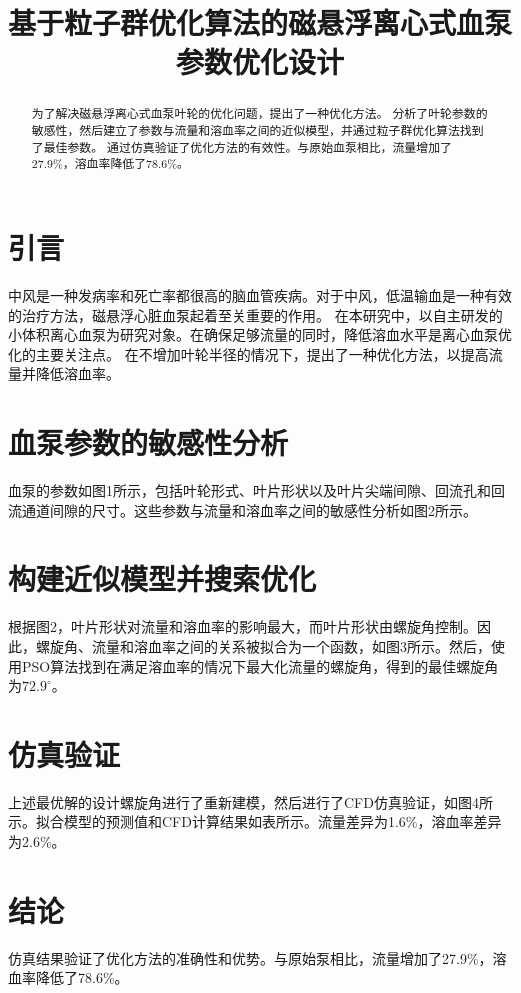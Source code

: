 \documentclass[12pt]{article}
\title{基于粒子群优化算法的磁悬浮离心式血泵参数优化设计}
\author{}
\begin{document}
{}
\begin{abstract}
为了解决磁悬浮离心式血泵叶轮的优化问题，提出了一种优化方法。
分析了叶轮参数的敏感性，然后建立了参数与流量和溶血率之间的近似模型，并通过粒子群优化算法找到了最佳参数。
通过仿真验证了优化方法的有效性。与原始血泵相比，流量增加了27.9\%，溶血率降低了78.6\%。
\end{abstract}

\section{引言}
中风是一种发病率和死亡率都很高的脑血管疾病。对于中风，低温输血是一种有效的治疗方法，磁悬浮心脏血泵起着至关重要的作用。
在本研究中，以自主研发的小体积离心血泵为研究对象。在确保足够流量的同时，降低溶血水平是离心血泵优化的主要关注点。
在不增加叶轮半径的情况下，提出了一种优化方法，以提高流量并降低溶血率。

\section{血泵参数的敏感性分析}
血泵的参数如图1所示，包括叶轮形式、叶片形状以及叶片尖端间隙、回流孔和回流通道间隙的尺寸。这些参数与流量和溶血率之间的敏感性分析如图2所示。

\section{构建近似模型并搜索优化}
根据图2，叶片形状对流量和溶血率的影响最大，而叶片形状由螺旋角控制。因此，螺旋角、流量和溶血率之间的关系被拟合为一个函数，如图3所示。然后，使用PSO算法找到在满足溶血率的情况下最大化流量的螺旋角，得到的最佳螺旋角为$72.9^\circ$。

\section{仿真验证}
上述最优解的设计螺旋角进行了重新建模，然后进行了CFD仿真验证，如图4所示。拟合模型的预测值和CFD计算结果如表所示。流量差异为1.6\%，溶血率差异为2.6\%。


\section{结论}
仿真结果验证了优化方法的准确性和优势。与原始泵相比，流量增加了27.9\%，溶血率降低了78.6\%。
\end{document}
